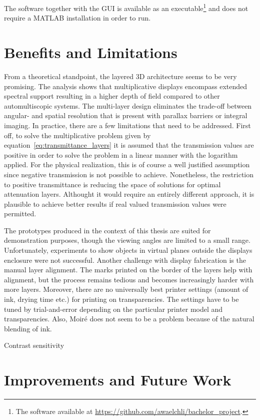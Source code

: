 The software together with the GUI is available as an executable\footnote{The software available at \url{https://github.com/awaelchli/bachelor_project}.} 
and does not require a \mbox{MATLAB} installation in order to run.

\section{Benefits and Limitations}
\label{sec:benefits_limitations}

From a theoretical standpoint, the layered 3D architecture seems to be very promising.
The analysis shows that multiplicative displays encompass extended spectral support resulting in a higher depth of field compared to other automultiscopic systems.
The multi-layer design eliminates the trade-off between angular- and spatial resolution that is present with parallax barriers or integral imaging.
In practice, there are a few limitations that need to be addressed.
First off, to solve the multiplicative problem given by equation~\ref{eq:transmittance_layers} it is assumed that the transmission values are positive in order to solve the problem in a linear manner with the logarithm applied.
For the physical realization, this is of course a well justified assumption since negative transmission is not possible to achieve.
Nonetheless, the restriction to positive transmittance is reducing the space of solutions for optimal attenuation layers.
Althought it would require an entirely different approach, it is plausible to achieve better results if real valued transmission values were permitted.

The prototypes produced in the context of this thesis are suited for demonstration purposes, though the viewing angles are limited to a small range.
Unfortunately, experiments to show objects in virtual planes outside the displays enclosure were not successful.
Another challenge with display fabrication is the manual layer alignment.
The marks printed on the border of the layers help with alignment, but the process remains tedious and becomes increasingly harder with more layers.
Moreover, there are no universally best printer settings (amount of ink, drying time etc.) for printing on transparencies.
The settings have to be tuned by trial-and-error depending on the particular printer model and transparencies.
Also, Moir\'{e} does not seem to be a problem because of the natural blending of ink.

Contrast sensitivity

\section{Improvements and Future Work}
\label{sec:future_work}

